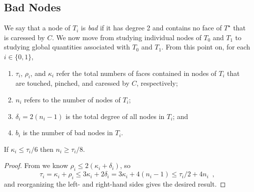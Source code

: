 \documentclass[a4paper,UKenglish]{socg-lipics-v2019}
\newcommand{\dual}[1]{{#1}^\star}
\begin{document}
\subsection{Bad Nodes}


We say that a node of $T_i$ is \emph{bad} if it has degree 2 and
contains no face of $\dual{T}$ that is caressed by $C$.  We now move
from studying individual nodes of $T_0$ and $T_1$ to studying global
quantities associated with $T_0$ and $T_1$.  From this point on, for
each $i\in\{0,1\}$,
\begin{enumerate}
  \item $\tau_i$, $\rho_i$, and $\kappa_i$ refer the total numbers of faces contained in nodes of $T_i$ that are touched, pinched, and caressed by $C$, respectively; 
  \item $n_i$ refers to the number of nodes of $T_i$;
  \item $\delta_i = 2(n_i-1)$ is the total degree of all nodes in $T_i$; and
  \item $b_i$ is the number of bad nodes in $T_i$.
\end{enumerate}


\begin{lem}
  If $\kappa_i \le \tau_i/6$ then $n_i\ge \tau_i/8$.
\end{lem}

\begin{proof}
	From  we know $\rho_i \le 2(\kappa_i+\delta_i)$, so
  \[
  \tau_i  = \kappa_i + \rho_i
     \le 3\kappa_i + 2\delta_i 
     = 3\kappa_i + 4(n_i-1) 
     \le \tau_i/2 + 4n_i \enspace ,
  \]
  and reorganizing the left- and right-hand sides gives the desired result.
\end{proof}
\end{document}
